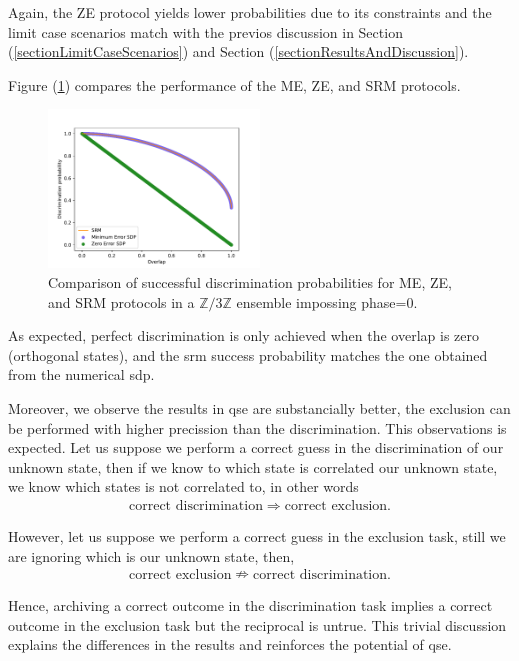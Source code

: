 \documentclass[12pt,letterpaper]{article}
\begin{document}
Again, the ZE protocol yields lower probabilities due to its constraints and the limit case scenarios match with the previos discussion in Section (\ref{sectionLimitCaseScenarios}) and Section (\ref{sectionResultsAndDiscussion}). 

Figure (\ref{FigureQSDMEZESRM}) compares the performance of the ME, ZE, and SRM protocols.

\begin{figure}[H]
	\centering
	\includegraphics[width=0.5\textwidth]{../Plots/DiscriminationOverlapVSSucessProbabilitySDPvsSRMZnOverlap3Phase0.pdf}
	\caption{Comparison of successful discrimination probabilities for ME, ZE, and SRM protocols in a $\mathbb{Z}/3\mathbb{Z}$ ensemble impossing phase=$0$.}
	\label{FigureQSDMEZESRM}
\end{figure}

As expected, perfect discrimination is only achieved when the overlap is zero (orthogonal states), and the \gls{srm} success probability matches the one obtained from the numerical \gls{sdp}. 

Moreover, we observe the results in \gls{qse} are substancially better, the exclusion can be performed with higher precission than the discrimination. This observations is expected. Let us suppose we perform a correct guess in the discrimination of our unknown state, then if we know to which state is correlated our unknown state, we know which states is not correlated to, in other words
\begin{align*}
	\text{correct discrimination}\Rightarrow\text{correct exclusion}.
\end{align*}

However, let us suppose we perform a correct guess in the exclusion task, still we are ignoring which is our unknown state, then,
\begin{align*}
	\text{correct exclusion}\nRightarrow\text{correct discrimination}.
\end{align*}

Hence, archiving a correct outcome in the discrimination task implies a correct outcome in the exclusion task but the reciprocal is untrue. This trivial discussion explains the differences in the results and reinforces the potential of \gls{qse}.
\end{document}
